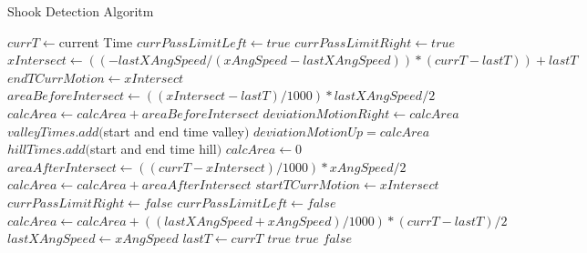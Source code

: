 \documentclass[a4paper,twoside]{article}
\begin{document}
\begin{enumerate}
\begin{algorithm}
	\caption{Shook Detection Algoritm}
	\label{alg:algoritma-pendeteksi-gerakan-menggeleng}
	\begin{algorithmic}[1]
		\State $currT \gets $current Time
			\State $currPassLimitLeft \gets true$
			\State $currPassLimitRight \gets true$
		\EndIf
			\State $xIntersect \gets ((-lastXAngSpeed / (xAngSpeed - lastXAngSpeed)) * (currT - lastT))+lastT$
			\State $endTCurrMotion \gets xIntersect$
			\State $areaBeforeIntersect \gets ((xIntersect - lastT) / 1000) * lastXAngSpeed / 2$
			\State $calcArea \gets calcArea + areaBeforeIntersect$
				\State $deviationMotionRight \gets calcArea$
					\State $valleyTimes.add($start and end time valley$)$
				\EndIf
				\State $deviationMotionUp = calcArea$
					\State $hillTimes.add($start and end time hill$)$
				\EndIf
			\EndIf
			\State $calcArea \gets 0$
			\State $areaAfterIntersect \gets ((currT - xIntersect) / 1000) * xAngSpeed / 2$ 
			\State $calcArea \gets calcArea + areaAfterIntersect$ 
			\State $startTCurrMotion \gets xIntersect$ 
			\State $currPassLimitRight \gets false$ 
			\State $currPassLimitLeft \gets false$ 
		\Else 
			\State $calcArea \gets calcArea + ((lastXAngSpeed + xAngSpeed) / 1000) * (currT - lastT) / 2$
		\EndIf
		\State $lastXAngSpeed \gets xAngSpeed$
		\State $lastT \gets currT$
			\Return $true$ 
			\Return $true$
		\Else 
			\Return $false$
		\EndIf
	\EndFunction  
	\end{algorithmic}
\end{algorithm} 


\end{enumerate}
\end{document}
